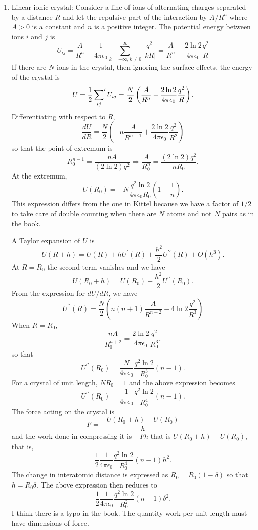 \documentclass{article}
\begin{document}
\begin{enumerate}
\item Linear ionic crystal: Consider a line of ions of alternating charges
separated by a distance $R$ and let the repulsive part of the interaction by
$A/R^n$ where $A > 0$ is a constant and $n$ is a positive integer. The potential
energy between ions $i$ and $j$ is
\[
U_{ij}=\frac{A}{R^n} - \frac{1}{4\pi\epsilon_0}\sum_{k=-\infty, k \ne 0}^\infty 
\frac{q^2}{|kR|} = \frac{A}{R^n} - \frac{2\ln 2}{4\pi\epsilon_0}\frac{q^2}{R}
\]
If there are $N$ ions in the crystal, then ignoring the surface effects, the
energy of the crystal is
\[
U = \frac{1}{2}\sideset{}{^\prime}\sum_{ij} U_{ij} = \frac{N}{2}\left(\frac{A}
{R^n} - \frac{2\ln 2}{4\pi\epsilon_0}\frac{q^2}{R}\right).
\]
Differentiating with respect to $R$,
\[
\frac{dU}{dR} = \frac{N}{2}\left(-n\frac{A}{R^{n+1}} + 
\frac{2\ln 2}{4\pi\epsilon_0}\frac{q^2}{R^2} \right)
\]
so that the point of extremum is
\[
R_0^{n-1} = \frac{nA}{(2\ln 2) q^2} \Rightarrow \frac{A}{R_0^{n}} = 
\frac{(2\ln 2)q^2}{nR_0}.
\]
At the extremum,
\[
U(R_0) = -N\frac{q^2\ln 2}{4\pi\epsilon_0R_0}\left(1 - \frac{1}{n}\right).
\]
This expression differs from the one in Kittel because we have a factor of 
$1/2$ to take care of double counting when there are $N$ atoms and not $N$ 
pairs as in the book.

A Taylor expansion of $U$ is
\[
U(R + h) = U(R) + hU^\prime(R) + \frac{h^2}{2}U^{\prime\prime}(R) + O(h^3).
\]
At $R = R_0$ the second term vanishes and we have
\[
U(R_0 + h) = U(R_0) + \frac{h^2}{2}U^{\prime\prime}(R_0).
\]
From the expression for $dU/dR$, we have
\[
U^{\prime\prime}(R) = \frac{N}{2}\left(n(n+1)\frac{A}{R^{n+2}} - 
4\ln 2\frac{q^2}{R^3}\right)
\]
When $R = R_0$, 
\[
\frac{nA}{R_0^{n+2}} = \frac{2\ln 2}{4\pi\epsilon_0}\frac{q^2}{R_0^3},
\]
so that
\[
U^{\prime\prime}(R_0) = \frac{N}{4\pi\epsilon_0}\frac{q^2\ln 2}{R_0^3}(n - 1).
\]
For a crystal of unit length, $NR_0 = 1$ and the above expression becomes
\[
U^{\prime\prime}(R_0) = \frac{1}{4\pi\epsilon_0}\frac{q^2\ln 2}{R_0^4}(n - 1).
\]
The force acting on the crystal is
\[
F = -\frac{U(R_0 + h) - U(R_0)}{h}
\]
and the work done in compressing it is $-Fh$ that is $U(R_0+h)-U(R_0)$, that is,
\[
\frac{1}{2}\frac{1}{4\pi\epsilon_0}\frac{q^2\ln 2}{R_0^4}(n - 1)h^2.
\]
The change in interatomic distance is expressed as $R_0 = R_0(1 - \delta)$ so 
that $h = R_0\delta$. The above expression then reduces to
\[
\frac{1}{2}\frac{1}{4\pi\epsilon_0}\frac{q^2\ln 2}{R_0^2}(n - 1)\delta^2.
\]
I think there is a typo in the book. The quantity work per unit length must have
dimensions of force.
\end{enumerate}
\end{document}
